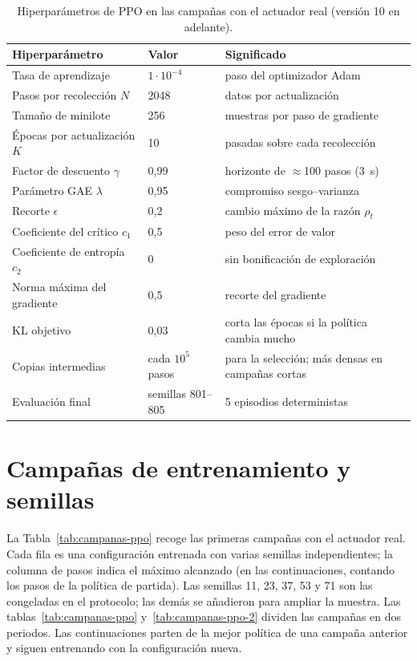 \begin{table}[H]
\centering
\caption{Hiperparámetros de PPO en las campañas con el actuador real (versión 10 en adelante).}
\label{tab:hiperparametros-ppo}
\small
\begin{tabular}{lll}
\toprule
Hiperparámetro & Valor & Significado \\
\midrule
Tasa de aprendizaje & $1\cdot10^{-4}$ & paso del optimizador Adam \\
Pasos por recolección $N$ & 2048 & datos por actualización \\
Tamaño de minilote & 256 & muestras por paso de gradiente \\
Épocas por actualización $K$ & 10 & pasadas sobre cada recolección \\
Factor de descuento $\gamma$ & 0,99 & horizonte de $\approx$100 pasos (3~s) \\
Parámetro GAE $\lambda$ & 0,95 & compromiso sesgo--varianza \\
Recorte $\epsilon$ & 0,2 & cambio máximo de la razón $\rho_t$ \\
Coeficiente del crítico $c_1$ & 0,5 & peso del error de valor \\
Coeficiente de entropía $c_2$ & 0 & sin bonificación de exploración \\
Norma máxima del gradiente & 0,5 & recorte del gradiente \\
KL objetivo & 0,03 & corta las épocas si la política cambia mucho \\
Copias intermedias & cada $10^5$ pasos & para la selección; más densas en campañas cortas \\
Evaluación final & semillas 801--805 & 5 episodios deterministas \\
\bottomrule
\end{tabular}
\end{table}

\section{Campañas de entrenamiento y semillas}

La Tabla~\ref{tab:campanas-ppo} recoge las primeras campañas con el actuador real.
Cada fila es una configuración entrenada con varias semillas independientes; la
columna de pasos indica el máximo alcanzado (en las continuaciones, contando los
pasos de la política de partida). Las semillas 11, 23, 37, 53 y 71 son las
congeladas en el protocolo; las demás se añadieron para ampliar la muestra. Las
tablas~\ref{tab:campanas-ppo} y~\ref{tab:campanas-ppo-2} dividen las campañas en
dos periodos. Las continuaciones parten de la mejor política de una campaña anterior y siguen
entrenando con la configuración nueva.

